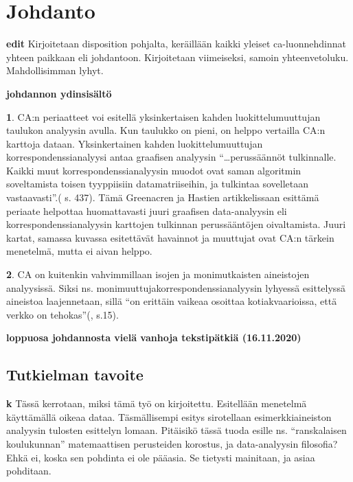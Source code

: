 \documentclass[
  finnish,
]{book}
\begin{document}
\hypertarget{johdanto}{%
\chapter{Johdanto}\label{johdanto}}

\textbf{edit} Kirjoitetaan disposition pohjalta, keräillään kaikki yleiset
ca-luonnehdinnat yhteen paikkaan eli johdantoon. Kirjoitetaan viimeiseksi, samoin
yhteenvetoluku. Mahdollisimman lyhyt.

\textbf{johdannon ydinsisältö}

\textbf{1}. CA:n periaatteet voi esitellä yksinkertaisen kahden luokittelumuuttujan
taulukon analyysin avulla. Kun taulukko on pieni, on helppo vertailla CA:n
karttoja dataan. Yksinkertainen kahden luokittelumuuttujan
korrespondenssianalyysi antaa graafisen analyysin ``\ldots perussäännöt
tulkinnalle. Kaikki muut korrespondenssianalyysin muodot ovat saman algoritmin
soveltamista toisen tyyppiisiin datamatriiseihin, ja tulkintaa sovelletaan vastaavasti''.(\citep{RefWorks:doc:5a857a44e4b0ed2d44664d84} s. 437). Tämä Greenacren ja Hastien artikkelissaan
esittämä periaate helpottaa huomattavasti juuri graafisen data-analyysin
eli korrespondenssianalyysin karttojen tulkinnan perussääntöjen oivaltamista. Juuri kartat,
samassa kuvassa esitettävät havainnot ja muuttujat ovat CA:n tärkein menetelmä, mutta ei
aivan helppo.

\textbf{2}. CA on kuitenkin vahvimmillaan isojen ja monimutkaisten aineistojen analyysissä.
Siksi ns. monimuuttujakorrespondenssianalyysin lyhyessä esittelyssä aineistoa
laajennetaan, sillä ``on erittäin vaikeaa osoittaa kotiakvaarioissa, että verkko on
tehokas''(\citep{RefWorks:doc:5a857a43e4b0ed2d44664d75}, s.15).

\textbf{loppuosa johdannosta vielä vanhoja tekstipätkiä (16.11.2020)}

\hypertarget{tutkielman-tavoite}{%
\section{Tutkielman tavoite}\label{tutkielman-tavoite}}

\textbf{k} Tässä kerrotaan, miksi tämä työ on kirjoitettu. Esitellään menetelmä
käyttämällä oikeaa dataa. Täsmällisempi esitys sirotellaan esimerkkiaineiston
analyysin tulosten esittelyn lomaan. Pitäisikö tässä tuoda esille ns. ``ranskalaisen
koulukunnan'' matemaattisen perusteiden korostus, ja data-analyysin filosofia?
Ehkä ei, koska sen pohdinta ei ole pääasia. Se tietysti mainitaan, ja asiaa pohditaan.
\end{document}
